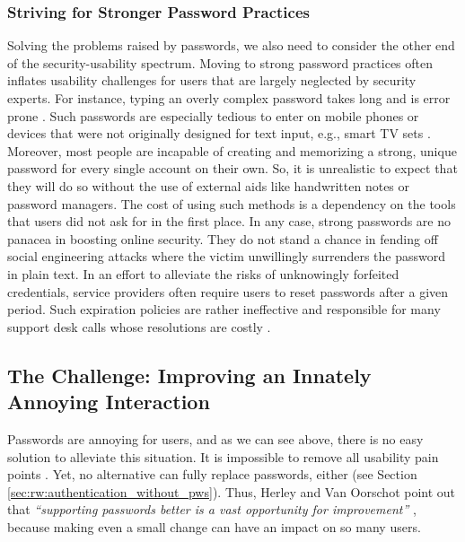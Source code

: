 \subsubsection{Striving for Stronger Password Practices}
Solving the problems raised by passwords, we also need to consider the other end of the security-usability spectrum. Moving to strong password practices often inflates usability challenges for users that are largely neglected by security experts. For instance, typing an overly complex password takes long and is error prone \cite{Shay2014CanLongPasswordsBeSecureAndUsable}. Such passwords are especially tedious to enter on mobile phones or devices that were not originally designed for text input, e.g., smart TV sets \cite{Melicher2016UsabilityMobileTextPasswords}. Moreover, most people are incapable of creating and memorizing a strong, unique password for every single account on their own. So, it is unrealistic to expect that they will do so without the use of external aids like handwritten notes or password managers. The cost of using such methods is a dependency on the tools that users did not ask for in the first place. In any case, strong passwords are no panacea in boosting online security. They do not stand a chance in fending off social engineering attacks where the victim unwillingly surrenders the password in plain text. In an effort to alleviate the risks of unknowingly forfeited credentials, service providers often require users to reset passwords after a given period. Such expiration policies are rather ineffective \cite{Chiasson2015QuantifyingExpiration} and responsible for many support desk calls whose resolutions are costly \cite{Adams1999UsersEnemy, Sasse2005UsableSecurityPosition}. 

\subsection{The Challenge: Improving an Innately Annoying Interaction}
Passwords are annoying for users, and as we can see above, there is no easy solution to alleviate this situation. It is impossible to remove all usability pain points \cite{Bonneau2012ReplacePasswords}. Yet, no alternative can fully replace passwords, either (see Section \ref{sec:rw:authentication_without_pws}). Thus, Herley and Van Oorschot point out that \textit{``supporting passwords better is a vast opportunity for improvement''} \cite{Herley2012PersistenceOfPasswords}, because making even a small change can have an impact on so many users. 

